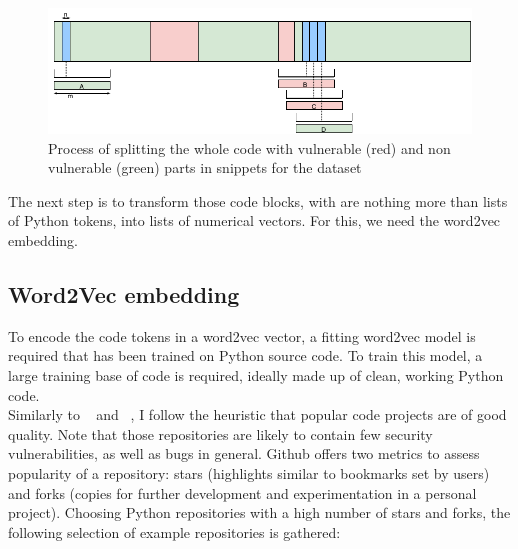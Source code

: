 \documentclass[
	a4paper,
	pagesize,
	pdftex,
	12pt,
	twoside, %
	BCOR=5mm, %
	ngerman,
	fleqn,
	final,
	]{scrartcl}
\begin{document}
\begin{figure}[ht]
	\centering
	\includegraphics[width=0.9\linewidth]{img/FocusBlocks}
	\caption{Process of splitting the whole code with vulnerable (red) and non vulnerable (green) parts in snippets for the dataset}
	\label{fig:FocusBlocks}
\end{figure}

The next step is to transform those code blocks, with are nothing more than lists of Python tokens, into lists of numerical vectors. For this, we need the word2vec embedding. 

\subsection{Word2Vec embedding}
To encode the code tokens in a word2vec vector, a fitting word2vec model is required that has been trained on Python source code. To train this model, a large training base of code is required, ideally made up of clean, working Python code.\\
Similarly to ~\cite{Bhoopchand.2016} and ~\cite{Allamanis.2013}, I follow the  heuristic that popular code projects are of good quality. Note that those repositories are likely to contain few security vulnerabilities, as well as bugs in general. Github offers two metrics to assess popularity of a repository: stars (highlights similar to bookmarks set by users) and forks (copies for further development and experimentation in a personal project). Choosing Python repositories with a high number of stars and forks, the following selection of example repositories is gathered:
\end{document}
